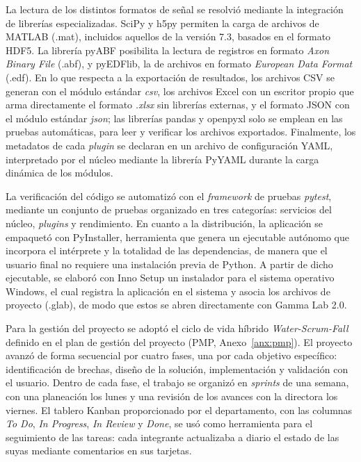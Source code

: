 \documentclass[12pt,letterpaper,oneside]{article}
\begin{document}
La lectura de los distintos formatos de señal se resolvió mediante la integración de librerías especializadas. SciPy y h5py permiten la carga de archivos de MATLAB (.mat), incluidos aquellos de la versión 7.3, basados en el formato HDF5. La librería pyABF posibilita la lectura de registros en formato \textit{Axon Binary File} (.abf), y pyEDFlib, la de archivos en formato \textit{European Data Format} (.edf). En lo que respecta a la exportación de resultados, los archivos CSV se generan con el módulo estándar \textit{csv}, los archivos Excel con un escritor propio que arma directamente el formato \textit{.xlsx} sin librerías externas, y el formato JSON con el módulo estándar \textit{json}; las librerías pandas y openpyxl solo se emplean en las pruebas automáticas, para leer y verificar los archivos exportados. Finalmente, los metadatos de cada \textit{plugin} se declaran en un archivo de configuración YAML, interpretado por el núcleo mediante la librería PyYAML durante la carga dinámica de los módulos.

La verificación del código se automatizó con el \textit{framework} de pruebas \textit{pytest}, mediante un conjunto de pruebas organizado en tres categorías: servicios del núcleo, \textit{plugins} y rendimiento. En cuanto a la distribución, la aplicación se empaquetó con PyInstaller, herramienta que genera un ejecutable autónomo que incorpora el intérprete y la totalidad de las dependencias, de manera que el usuario final no requiere una instalación previa de Python. A partir de dicho ejecutable, se elaboró con Inno Setup un instalador para el sistema operativo Windows, el cual registra la aplicación en el sistema y asocia los archivos de proyecto (.glab), de modo que estos se abren directamente con Gamma Lab 2.0.

Para la gestión del proyecto se adoptó el ciclo de vida híbrido \textit{Water-Scrum-Fall} definido en el plan de gestión del proyecto (PMP, Anexo~\ref{anx:pmp}). El proyecto avanzó de forma secuencial por cuatro fases, una por cada objetivo específico: identificación de brechas, diseño de la solución, implementación y validación con el usuario. Dentro de cada fase, el trabajo se organizó en \textit{sprints} de una semana, con una planeación los lunes y una revisión de los avances con la directora los viernes. El tablero Kanban proporcionado por el departamento, con las columnas \textit{To Do}, \textit{In Progress}, \textit{In Review} y \textit{Done}, se usó como herramienta para el seguimiento de las tareas: cada integrante actualizaba a diario el estado de las suyas mediante comentarios en sus tarjetas.
\end{document}
